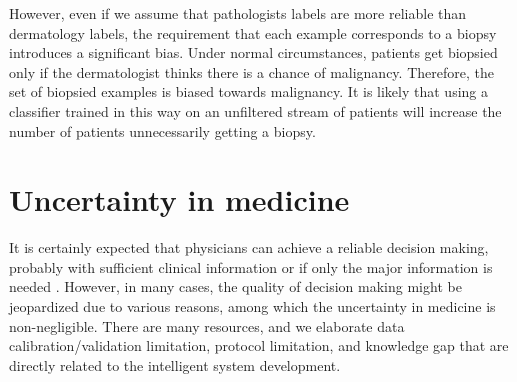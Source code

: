 \documentclass[9pt,twocolumn,twoside]{pnas-new}
\begin{document}
However, even if we assume that pathologists labels are more reliable
than dermatology labels, the requirement that each example corresponds
to a biopsy introduces a significant bias. Under normal circumstances, patients get
biopsied only if the dermatologist thinks there is a chance of
{\color{blue}malignancy. Therefore}, the set of biopsied examples is biased towards
{\color{blue}malignancy}. It is likely that using a classifier trained in this way
on an unfiltered stream of patients will increase the number of
patients unnecessarily getting a biopsy.

\section*{Uncertainty in medicine}

%
It is certainly expected that physicians can achieve a reliable
  decision making, probably with sufficient clinical information
  \cite{mehta2011agreement} or if only the major information is needed
  \cite{atiya2003interobserver}. However, in many cases, the quality of decision making might be jeopardized due to various reasons, among which the uncertainty in medicine is non-negligible.
  There are many resources, and we elaborate data calibration/validation limitation, protocol limitation, and knowledge gap that are directly related to the intelligent system development. 







\end{document}
